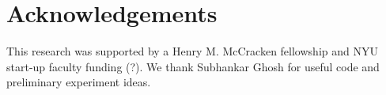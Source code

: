 \section{Acknowledgements}

This research was supported by a Henry M. McCracken fellowship and NYU
start-up faculty funding (?). We thank Subhankar Ghosh for useful code and
preliminary experiment ideas.